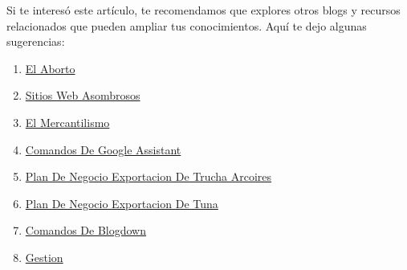 \documentclass[
  jou,
  floatsintext,
  longtable,
  a4paper,
  nolmodern,
  notxfonts,
  notimes,
  colorlinks=true,linkcolor=blue,citecolor=blue,urlcolor=blue]{apa7}
\providecommand{\tightlist}{%
  \setlength{\itemsep}{0pt}\setlength{\parskip}{0pt}}
\begin{document}
Si te interesó este artículo, te recomendamos que explores otros blogs y
recursos relacionados que pueden ampliar tus conocimientos. Aquí te dejo
algunas sugerencias:

\begin{enumerate}
\def\labelenumi{\arabic{enumi}.}
\tightlist
\item
  \href{https://achalmaedison.netlify.app/blog/posts/2015-05-14-el-aborto/index.pdf}{}
  \href{https://achalmaedison.netlify.app/blog/posts/2015-05-14-el-aborto}{El
  Aborto}
\item
  \href{https://achalmaedison.netlify.app/blog/posts/2017-04-23-sitios-web-asombrosos/index.pdf}{}
  \href{https://achalmaedison.netlify.app/blog/posts/2017-04-23-sitios-web-asombrosos}{Sitios
  Web Asombrosos}
\item
  \href{https://achalmaedison.netlify.app/blog/posts/2017-05-23-el-mercantilismo/index.pdf}{}
  \href{https://achalmaedison.netlify.app/blog/posts/2017-05-23-el-mercantilismo}{El
  Mercantilismo}
\item
  \href{https://achalmaedison.netlify.app/blog/posts/2020-05-23-comandos-de-google-assistant/index.pdf}{}
  \href{https://achalmaedison.netlify.app/blog/posts/2020-05-23-comandos-de-google-assistant}{Comandos
  De Google Assistant}
\item
  \href{https://achalmaedison.netlify.app/blog/posts/2020-09-15-plan-de-negocio-exportacion-de-trucha-arcoires/index.pdf}{}
  \href{https://achalmaedison.netlify.app/blog/posts/2020-09-15-plan-de-negocio-exportacion-de-trucha-arcoires}{Plan
  De Negocio Exportacion De Trucha Arcoires}
\item
  \href{https://achalmaedison.netlify.app/blog/posts/2021-07-13-plan-de-negocio-exportacion-de-tuna/index.pdf}{}
  \href{https://achalmaedison.netlify.app/blog/posts/2021-07-13-plan-de-negocio-exportacion-de-tuna}{Plan
  De Negocio Exportacion De Tuna}
\item
  \href{https://achalmaedison.netlify.app/blog/posts/2021-07-14-comandos-de-blogdown/index.pdf}{}
  \href{https://achalmaedison.netlify.app/blog/posts/2021-07-14-comandos-de-blogdown}{Comandos
  De Blogdown}
\item
  \href{https://achalmaedison.netlify.app/blog/posts/2021-10-01-gestion-publica-y-administracion-publica/index.pdf}{}
  \href{https://achalmaedison.netlify.app/blog/posts/2021-10-01-gestion-publica-y-administracion-publica}{Gestion
}
\end{enumerate}
\end{document}
